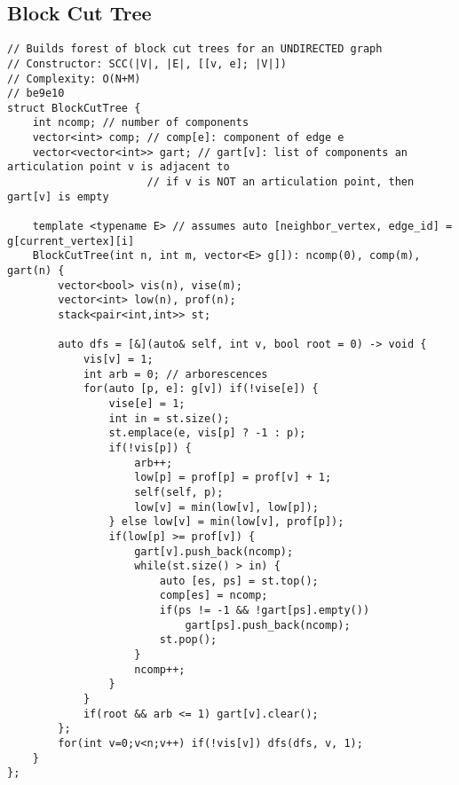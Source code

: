 \documentclass{article}
\begin{document}
\subsection{Block Cut Tree}
\begin{verbatim}
// Builds forest of block cut trees for an UNDIRECTED graph
// Constructor: SCC(|V|, |E|, [[v, e]; |V|])
// Complexity: O(N+M)
// be9e10
struct BlockCutTree {
	int ncomp; // number of components
	vector<int> comp; // comp[e]: component of edge e
	vector<vector<int>> gart; // gart[v]: list of components an articulation point v is adjacent to
			          // if v is NOT an articulation point, then gart[v] is empty
				
	template <typename E> // assumes auto [neighbor_vertex, edge_id] = g[current_vertex][i]
	BlockCutTree(int n, int m, vector<E> g[]): ncomp(0), comp(m), gart(n) {
		vector<bool> vis(n), vise(m);
		vector<int> low(n), prof(n);
		stack<pair<int,int>> st;

		auto dfs = [&](auto& self, int v, bool root = 0) -> void {
			vis[v] = 1;
			int arb = 0; // arborescences
			for(auto [p, e]: g[v]) if(!vise[e]) {
				vise[e] = 1;
				int in = st.size();
				st.emplace(e, vis[p] ? -1 : p);
				if(!vis[p]) {
					arb++;
					low[p] = prof[p] = prof[v] + 1;
					self(self, p);
					low[v] = min(low[v], low[p]);
				} else low[v] = min(low[v], prof[p]);
				if(low[p] >= prof[v]) {
					gart[v].push_back(ncomp);
					while(st.size() > in) {
						auto [es, ps] = st.top();
						comp[es] = ncomp;
						if(ps != -1 && !gart[ps].empty())
							gart[ps].push_back(ncomp);
						st.pop();
					}
					ncomp++;
				}
			}
			if(root && arb <= 1) gart[v].clear();
		};
		for(int v=0;v<n;v++) if(!vis[v]) dfs(dfs, v, 1);
	}
};
\end{verbatim}
\end{document}
